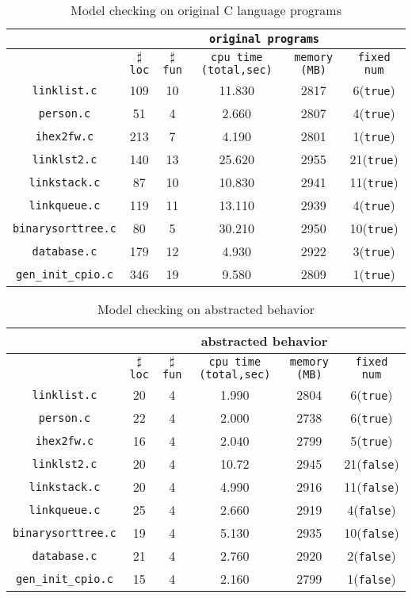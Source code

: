 \begin{table}
\begin{tabular}{|c|c|c|c|c|c|}
\hline
& \multicolumn{5}{|c|}{\texttt{original programs}}  \\
\hline
 & $\sharp$\texttt{loc} & $\sharp$\texttt{fun} & \texttt{cpu time (total,sec)} & \texttt{memory (MB)} & \texttt{fixed num} \\
\hline
\texttt{linklist.c} & 109 & 10 & 11.830 & 2817 & 6(\texttt{true})  \\
\hline
\texttt{person.c} & 51 & 4 & 2.660 & 2807 & 4(\texttt{true})  \\
\hline
\texttt{ihex2fw.c} & 213 & 7 & 4.190 & 2801 & 1(\texttt{true}) \\
\hline
\texttt{linklst2.c} & 140 & 13 & 25.620 & 2955 & 21(\texttt{true}) \\
\hline
\texttt{linkstack.c}  & 87 & 10 & 10.830 & 2941 & 11(\texttt{true}) \\
\hline
\texttt{linkqueue.c} & 119 & 11 & 13.110 & 2939 & 4(\texttt{true}) \\
\hline
\texttt{binarysorttree.c} & 80 & 5 & 30.210 & 2950 & 10(\texttt{true})  \\
\hline
\texttt{database.c} & 179 & 12 & 4.930 & 2922 & 3(\texttt{true}) \\
\hline
\texttt{gen\_init\_cpio.c} & 346 & 19 & 9.580 & 2809 & 1(\texttt{true}) \\
\hline
\end{tabular}
\caption{Model checking on original C language programs}
\label{tb:mcc}
\end{table}

\begin{table}
\begin{tabular}{|c|c|c|c|c|c|}
\hline
&\multicolumn{5}{|c|}{abstracted behavior} \\
\hline
 &$\sharp$\texttt{loc} & $\sharp$\texttt{fun} & \texttt{cpu time (total,sec)} & \texttt{memory (MB)} & \texttt{fixed num} \\
\hline
\texttt{linklist.c} &  20 & 4 & 1.990 & 2804 & 6(\texttt{true}) \\
\hline
\texttt{person.c} & 22 & 4 & 2.000 & 2738 & 6(\texttt{true})  \\
\hline
\texttt{ihex2fw.c}  & 16 & 4 & 2.040 & 2799 & 5(\texttt{true}) \\
\hline
\texttt{linklst2.c} & 20 & 4 & 10.72 & 2945 & 21(\texttt{false}) \\
\hline
\texttt{linkstack.c} & 20 & 4 & 4.990 & 2916 & 11(\texttt{false}) \\
\hline
\texttt{linkqueue.c} & 25 & 4 & 2.660 & 2919 & 4(\texttt{false}) \\
\hline
\texttt{binarysorttree.c} & 19 & 4 & 5.130 & 2935 & 10(\texttt{false}) \\
\hline
\texttt{database.c}  & 21 & 4 & 2.760 & 2920 & 2(\texttt{false}) \\
\hline
\texttt{gen\_init\_cpio.c} & 15 & 4 & 2.160 & 2799 & 1(\texttt{false}) \\
\hline
\end{tabular}
\caption{Model checking on abstracted behavior}
\label{tb:mca}
\end{table}


